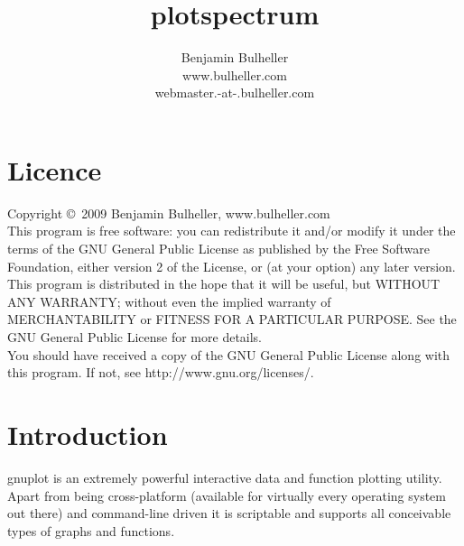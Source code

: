 \documentclass[12pt, a4paper]{article}
\title{plotspectrum}
\author{Benjamin Bulheller\\ \small www.bulheller.com\\ \small webmaster.-at-.bulheller.com}
\begin{document}
\maketitle

{
\linespread{1.0}\normalsize
\setlength{\parskip}{0.4em}
\tableofcontents
}


\section*{Licence}

\noindent
Copyright \copyright\ 2009 Benjamin Bulheller, www.bulheller.com \\[1ex]
This program is free software: you can redistribute it and/or modify it under the terms of the GNU General Public License as published by the Free Software Foundation, either version 2 of the License, or (at your option) any later version. \\[1ex]
This program is distributed in the hope that it will be useful, but WITHOUT ANY WARRANTY; without even the implied warranty of MERCHANTABILITY or FITNESS FOR A PARTICULAR PURPOSE.  See the GNU General Public License for more details. \\[1ex]
You should have received a copy of the GNU General Public License along with this program.  If not, see http://www.gnu.org/licenses/. \\[1ex]

\newpage


\section{Introduction}

gnuplot\cite{gnuplot} is an extremely powerful interactive data and function plotting utility. Apart from being cross-platform (available for virtually every operating system out there) and command-line driven it is scriptable and supports all conceivable types of graphs and functions.
\end{document}
